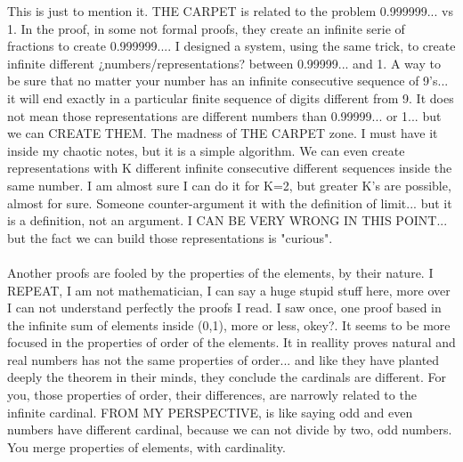 		\noindent
		This is just to mention it. THE CARPET is related to the problem 0.999999... vs 1. In the proof, in some not formal proofs, they create an infinite serie of fractions to create 0.999999.... I designed a system, using the same trick, to create infinite different ¿numbers/representations? between 0.99999... and 1. A way to be sure that no matter your number has an infinite consecutive sequence of 9's... it will end exactly in a particular finite sequence of digits different from 9. It does not mean those representations are different numbers than 0.99999... or 1... but we can CREATE THEM. The madness of THE CARPET zone. I must have it inside my chaotic notes, but it is a simple algorithm. We can even create representations with K different infinite consecutive different sequences inside the same number. I am almost sure I can do it for K=2, but greater K's are possible, almost for sure. Someone counter-argument it with the definition of limit... but it is a definition, not an argument. I CAN BE VERY WRONG IN THIS POINT... but the fact we can build those representations is "curious".
		\\\\
		
		\noindent
		Another proofs are fooled by the properties of the elements, by their nature. I REPEAT, I am not mathematician, I can say a huge stupid stuff here, more over I can not understand perfectly the proofs I read. I saw once, one proof based in the infinite sum of elements inside (0,1), more or less, okey?. It seems to be more focused in the properties of order of the elements. It in reallity proves natural and real numbers has not the same properties of order... and like they have planted deeply the theorem in their minds, they conclude the cardinals are different. For you, those properties of order, their differences, are narrowly related to the infinite cardinal. FROM MY PERSPECTIVE, is like saying odd and even numbers have different cardinal, because we can not divide by two, odd numbers. You merge properties of elements, with cardinality.
		\\\\
		

